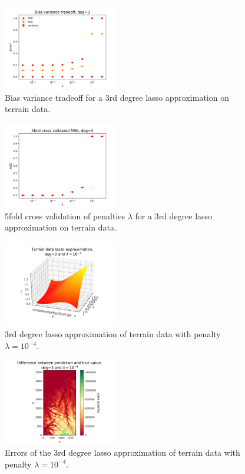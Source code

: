 \documentclass[notitlepage, reprint, nofootinbib]{revtex4-1}
\begin{document}
\begin{figure}
	\centering
	\includegraphics[width=0.45\textwidth]{../Figures/b-v_tradeoff_terrain_lasso_deg3.png}
	\caption{Bias variance tradeoff for a 3rd degree lasso approximation on terrain data.}
	\label{fig24}
\end{figure}

\clearpage

\begin{figure}
	\centering
	\includegraphics[width=0.45\textwidth]{../Figures/kfold_mse_terrain_lasso_deg3.png}
	\caption{5fold cross validation of penalties $\lambda$ for a 3rd degree lasso approximation on terrain data.}
	\label{fig25}
\end{figure}

\begin{figure}
	\centering
	\includegraphics[width=0.45\textwidth]{../Figures/terrain_lasso_deg3_adjusted.png}
	\caption{3rd degree lasso approximation of terrain data with penalty $\lambda=10^{-4}$.}
	\label{fig26}
\end{figure}

\begin{figure}
	\centering
	\includegraphics[width=0.45\textwidth]{../Figures/terrain_lasso_error_deg3.png}
	\caption{Errors of the 3rd degree lasso approximation of terrain data with penalty $\lambda=10^{-4}$.}
	\label{fig27}
\end{figure}
\end{document}
